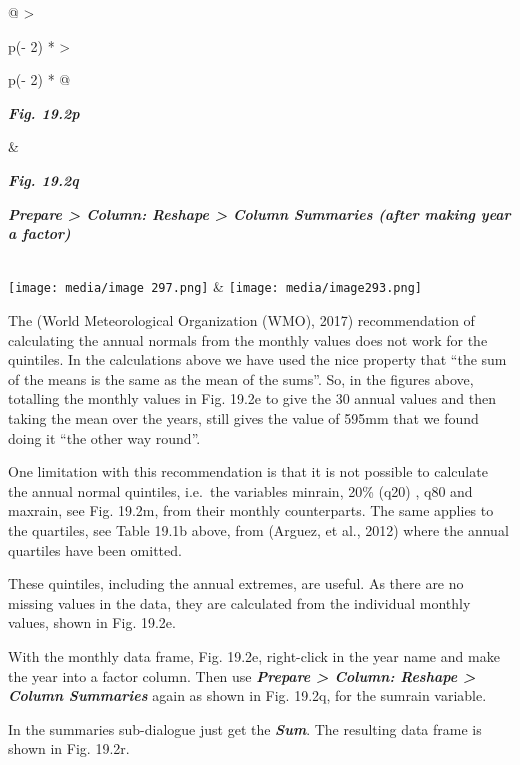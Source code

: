 \documentclass[
  letterpaper,
  DIV=11,
  numbers=noendperiod]{scrreprt}
\begin{document}
\begin{longtable}[]{@{}
  >{\raggedright\arraybackslash}p{(\columnwidth - 2\tabcolsep) * }
  >{\raggedright\arraybackslash}p{(\columnwidth - 2\tabcolsep) * }@{}}
\toprule\noalign{}
\begin{minipage}[b]{\linewidth}\raggedright
\textbf{\emph{Fig. 19.2p}}
\end{minipage} & \begin{minipage}[b]{\linewidth}\raggedright
\textbf{\emph{Fig. 19.2q}}

\textbf{\emph{Prepare \textgreater{} Column: Reshape \textgreater{}
Column Summaries (after making year a factor)}}
\end{minipage} \\
\midrule\noalign{}
\endhead
\bottomrule\noalign{}
\endlastfoot
\texttt{[image: media/image 297.png]} &
\texttt{[image: media/image293.png]} \\
\end{longtable}

The (World Meteorological Organization (WMO), 2017) recommendation of
calculating the annual normals from the monthly values does not work for
the quintiles. In the calculations above we have used the nice property
that ``the sum of the means is the same as the mean of the sums''. So,
in the figures above, totalling the monthly values in Fig. 19.2e to give
the 30 annual values and then taking the mean over the years, still
gives the value of 595mm that we found doing it ``the other way round''.

One limitation with this recommendation is that it is not possible to
calculate the annual normal quintiles, i.e.~the variables minrain, 20\%
(q20) , q80 and maxrain, see Fig. 19.2m, from their monthly
counterparts. The same applies to the quartiles, see Table 19.1b above,
from (Arguez, et al., 2012) where the annual quartiles have been
omitted.

These quintiles, including the annual extremes, are useful. As there are
no missing values in the data, they are calculated from the individual
monthly values, shown in Fig. 19.2e.

With the monthly data frame, Fig. 19.2e, right-click in the year name
and make the year into a factor column. Then use \textbf{\emph{Prepare
\textgreater{} Column: Reshape \textgreater{} Column Summaries}} again
as shown in Fig. 19.2q, for the sumrain variable.

In the summaries sub-dialogue just get the \textbf{\emph{Sum}}. The
resulting data frame is shown in Fig. 19.2r.
\end{document}
